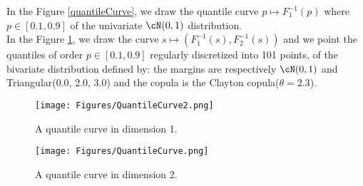 In the Figure \ref{quantileCurve}, we draw the quantile curve $p \mapsto F_1^{-1}(p)$ where  $p\in[0.1, 0.9]$ of the univariate $\cN(0,1)$ distribution.\\

In the Figure \ref{quantileCurve2d}, we draw the curve  $s \mapsto (F_1^{-1}(s), F_2^{-1}(s))$  and we point the quantiles of order $p \in [0.1, 0.9]$ regularly discretized into 101 points, of the bivariate distribution defined by: the margins are respectively  $\cN(0,1)$ and Triangular(0.0, 2.0, 3.0) and the copula is the Clayton copula($\theta=2.3$).


\begin{figure}[H]
  \begin{minipage}{9cm}
    \begin{center}
      \texttt{[image: Figures/QuantileCurve2.png]}
      \caption{A quantile curve in dimension 1.}
      \label{quantileCurve}
    \end{center}
  \end{minipage}
  \hfill
  \begin{minipage}{9cm}
    \begin{center}
      \texttt{[image: Figures/QuantileCurve.png]}
      \caption{A quantile curve in dimension 2.}
      \label{quantileCurve2d}
    \end{center}
  \end{minipage}
\end{figure}
